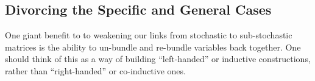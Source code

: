 \documentclass{article}
\begin{document}
	\subsection{Divorcing the Specific and General Cases}
	
	One giant benefit to to weakening our links from stochastic to sub-stochastic matrices is the ability to un-bundle and re-bundle variables back together. One should think of this as a way of building ``left-handed'' or inductive constructions, rather than ``right-handed'' or co-inductive ones. 
	
	\begin{center}
		\begin{tikzpicture}
		
		\end{tikzpicture}
	\end{center}
	
\end{document}
